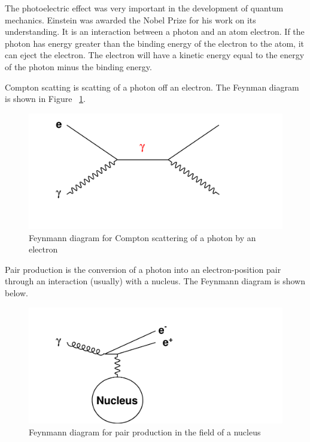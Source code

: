 The photoelectric effect was very important in the development of quantum mechanics.  Einstein was awarded the Nobel Prize for his work on its understanding.  It is an interaction between a photon and an atom electron.  If the photon has energy greater than the binding energy of the electron to the atom, it can eject the electron.  The electron will have a kinetic energy equal to the energy of the photon minus the binding energy.


Compton scatting is scatting of a photon off an electron.  The Feynman diagram is shown in Figure ~\ref{fig:compton}. 


\begin{figure}[h]
\centering\includegraphics[scale=0.5]{./particleinteractions/Pictures/compton.pdf}
\caption{Feynmann diagram for Compton scattering of a photon by an electron}
\label{fig:compton}
\end{figure}

Pair production is the conversion of a photon into an electron-position pair through an interaction (usually) with a nucleus.  The Feynmann diagram is shown below.


\begin{figure}[h]
\centering\includegraphics[scale=0.5]{./particleinteractions/Pictures/pairproduction.pdf}
\caption{Feynmann diagram for pair production in the field of a nucleus}
\label{fig:pairproduction}
\end{figure}



